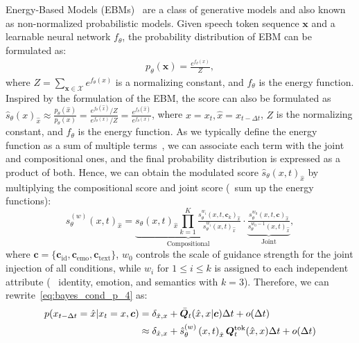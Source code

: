 Energy-Based Models (EBMs)~\cite{EBM:conf/iccv/GuoMJYYL23,EBM:conf/icml/GengHJZCHL24,compositional:conf/eccv/LiuLDTT22} are a class of generative models and also known as non-normalized probabilistic models. Given speech token sequence $\bm{x}$ and a learnable neural network $f_\theta$, the probability distribution of EBM can be formulated as:
\begin{equation}
\label{eq:ebm1}
\begin{aligned}
    p_\theta\left(\bm{x}\right) = \frac{e^{f_\theta(x)}}{Z},
\end{aligned}
\end{equation}
where $Z=\sum_{\bm{x}\in \mathcal{X}}e^{f_\theta(x)}$ is a normalizing constant, and $f_\theta$ is the energy function. 
Inspired by the formulation of the EBM, the score can also be formulated as $\hat{s}_\theta(x)_{\hat{x}}\approx \frac{p_{\theta} ( \hat{x} )} {p_{\theta} ( x )}=\frac{e^{f_{\theta} ( \hat{x} )} / Z} {e^{f_{\theta} ( x )} / Z}=\frac{e^{f_{\theta} ( \hat{x} )}} {e^{f_{\theta} ( x )}}$, where $x = x_t, \hat{x} = x_{t- \Delta t}$, $Z$ is the normalizing constant, and $f_\theta$ is the energy function. As we typically define the energy function as a sum of multiple terms~\cite{kim2016deep}, we can associate each term with the joint and compositional ones, and the final probability distribution is expressed as a product of both.
Hence, we can obtain the modulated score $\hat{s}_\theta\left({x}, t\right)_{\hat{x}}$ by multiplying the compositional score and joint score (\ie~sum up the energy functions):
\begin{equation}
\label{eq:pfg_ap}
    \hat{s}^{(w)}_\theta\left({x},t\right)_{\hat{x}} \!=\!   \underbrace{s_\theta(x,t)_{\hat{x}}\prod\limits_{k=1}^{K} \tfrac{s^{w_i} _\theta(x,t,\bm{c}_k)_{\hat{x}}}{s^{w_i} _\theta(x,t)_{\hat{x}}}}_\text{Compositional} \cdot \underbrace{\tfrac{s^{w_0} _\theta(x,t,\bm{c})_{\hat{x}}}{s^{w_0-1} _\theta(x,t)_{\hat{x}}}}_\text{Joint},
\end{equation}
where $\bm{c}=\{\bm{c}_\text{id},\bm{c}_\text{emo},\bm{c}_\text{text}\}$, $w_0$ controls the scale of guidance strength for the joint injection of all conditions, while $w_i$ for $1\leq i \leq k$ is assigned to each independent attribute (\ie~ identity, emotion, and semantics with $k=3$). Therefore, we can rewrite~\cref{eq:bayes_cond_p_4} as:
\begin{equation}
\label{eq:bayes_cond_p_5}
\begin{aligned}
p ( x_{t-\Delta t} =\hat{x} | x_{t}=x, \bm{c} )  & = \delta_{\hat{x}, x} + \bar{{\bm{Q}}}_t(\hat{x},x|\bm{c})\Delta t + o(\Delta t)\\
& \approx \delta_{\hat{x}, x} + \hat{s}^{(w)}_\theta\left({x},t\right)_{\hat{x}}{\bm{Q}}^\text{tok}_t(\hat{x},x)\Delta t + o(\Delta t)
\end{aligned}
\end{equation}

